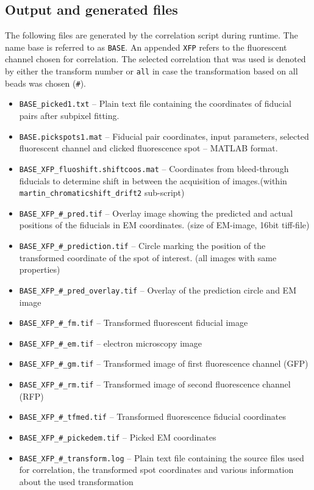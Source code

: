 \documentclass[10pt,a4paper,onepage,DIV12]{scrartcl}
\begin{document}
\subsection{Output and generated files}
The following files are generated by the correlation script during runtime. The name base is referred to as \texttt{BASE}. An appended \texttt{XFP} refers to the fluorescent channel chosen for correlation. The selected correlation that was used is denoted by either the transform number or \texttt{all} in case the transformation based on all beads was chosen (\texttt{\#}). 
\begin{itemize}
 \item \texttt{BASE\_picked1.txt} -- Plain text file containing the coordinates of fiducial pairs after subpixel fitting. 

\item \texttt{BASE.pickspots1.mat} -- Fiducial pair coordinates, input parameters, selected fluorescent channel and clicked fluorescence spot -- MATLAB format.

 \item \texttt{BASE\_XFP\_fluoshift.shiftcoos.mat} -- Coordinates from bleed-through fiducials to determine shift in between the acquisition of images.(within \texttt{martin\_chromaticshift\_drift2} sub-script)



\item \texttt{BASE\_XFP\_\#\_pred.tif} -- Overlay image showing the predicted and actual positions of the fiducials in EM coordinates. (size of EM-image, 16bit tiff-file)
\item \texttt{BASE\_XFP\_\#\_prediction.tif} -- Circle marking the position of the transformed coordinate of the spot of interest. (all images with same properties)
\item \texttt{BASE\_XFP\_\#\_pred\_overlay.tif} -- Overlay of the prediction circle and EM image
\item \texttt{BASE\_XFP\_\#\_fm.tif} -- Transformed fluorescent fiducial image 
\item \texttt{BASE\_XFP\_\#\_em.tif} -- electron microscopy image 
\item \texttt{BASE\_XFP\_\#\_gm.tif} -- Transformed image of first fluorescence channel (GFP)
\item \texttt{BASE\_XFP\_\#\_rm.tif} -- Transformed image of second fluorescence channel (RFP)
\item \texttt{BASE\_XFP\_\#\_tfmed.tif} -- Transformed fluorescence fiducial coordinates
\item \texttt{BASE\_XFP\_\#\_pickedem.tif} -- Picked EM coordinates

\item \texttt{BASE\_XFP\_\#\_transform.log} -- Plain text file containing the source files used for correlation, the transformed spot coordinates and various information about the used transformation
\end{itemize}
\end{document}

